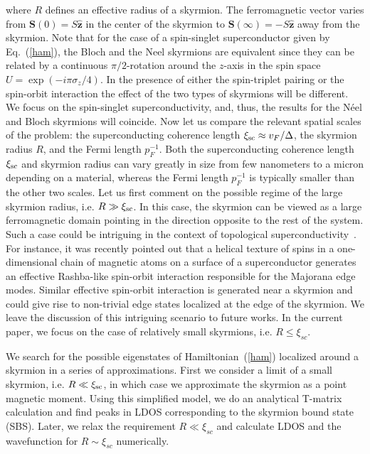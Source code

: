 \documentclass[twocolumn,showpacs,floatfix,longbibliography]{revtex4-1}
\begin{document}
where $R$ defines an effective radius of a skyrmion. The ferromagnetic vector varies from $\bm S(0) = S\hat{\bm z}$ in the center of the skyrmion to $\bm S(\infty) = -S\hat{\bm z}$ away from the skyrmion. Note that for the case of a spin-singlet superconductor given by Eq.~(\ref{ham}), the Bloch and the Neel skyrmions are equivalent since they can be related by a continuous $\pi/2$-rotation around the $z$-axis in the spin space $U = \exp(-i\pi\sigma_z/4)$. In the presence of either the spin-triplet pairing or the spin-orbit interaction the effect of the two types of skyrmions will be different. We focus on the spin-singlet superconductivity, and, thus, the results for the N\'eel and Bloch skyrmions will coincide. Now let us compare the relevant spatial scales of the problem: the superconducting coherence length $\xi_{\rm sc} \approx v_F/\Delta$, the skyrmion radius $R$, and the Fermi length $p_F^{-1}$. Both the superconducting coherence length $\xi_{\rm sc}$ and skyrmion radius can vary greatly in size from few nanometers to a micron depending on a material, whereas the Fermi length $p_F^{-1}$ is typically smaller than the other two scales. Let us first comment on the possible regime of the large skyrmion radius, i.e. $R\gg \xi_{\rm sc}$. In this case, the skyrmion can be viewed as a large ferromagnetic domain pointing in the direction opposite to the rest of the system. Such a case could be intriguing in the context of topological superconductivity~\cite{Alicea2012}. For instance, it was recently pointed out \cite{Klinovaja2013} that a helical texture of spins in a one-dimensional chain of magnetic atoms on a surface of a superconductor generates an effective Rashba-like spin-orbit interaction responsible for the Majorana edge modes. Similar effective spin-orbit interaction is generated near a skyrmion and could give rise to non-trivial edge states localized at the edge of the skyrmion. We leave the discussion of this intriguing scenario to future works. In the current paper, we focus on the case of relatively small skyrmions, i.e. $R\le \xi_{sc}$. 

We search for the possible eigenstates of Hamiltonian~(\ref{ham}) localized around a skyrmion in a series of approximations. First we consider a limit of a small skyrmion, i.e. $R\ll \xi_{\rm sc}$, in which case we approximate the skyrmion as a point magnetic moment. Using this simplified model, we do an analytical T-matrix calculation and find peaks in LDOS corresponding to the skyrmion bound state (SBS). Later, we relax the requirement $R\ll \xi_{sc}$ and calculate LDOS and the wavefunction for $R\sim \xi_{sc}$ numerically. 
\end{document}
